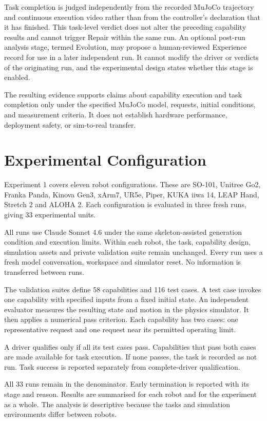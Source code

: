 Task completion is judged independently from the recorded MuJoCo trajectory
and continuous execution video rather than from the controller's declaration
that it has finished. This task-level verdict does not alter the preceding
capability results and cannot trigger Repair within the same run. An optional
post-run analysis stage, termed Evolution, may propose a human-reviewed
Experience record for use in a later independent run. It cannot modify the
driver or verdicts of the originating run, and the experimental design states
whether this stage is enabled.

The resulting evidence supports claims about capability execution and task
completion only under the specified MuJoCo model, requests, initial conditions,
and measurement criteria. It does not establish hardware performance,
deployment safety, or sim-to-real transfer.


\section{Experimental Configuration}

Experiment 1 covers eleven robot configurations. These are SO-101, Unitree
Go2, Franka Panda, Kinova Gen3, xArm7, UR5e, Piper, KUKA iiwa 14, LEAP Hand,
Stretch 2 and ALOHA 2. Each configuration is evaluated in three fresh runs,
giving 33 experimental units.

All runs use Claude Sonnet 4.6 under the same skeleton-assisted generation
condition and execution limits. Within each robot, the task, capability design,
simulation assets and private validation suite remain unchanged. Every run uses
a fresh model conversation, workspace and simulator reset. No information is
transferred between runs.

The validation suites define 58 capabilities and 116 test cases. A test case
invokes one capability with specified inputs from a fixed initial state. An
independent evaluator measures the resulting state and motion in the physics
simulator. It then applies a numerical pass criterion. Each capability has two
cases: one representative request and one request near its permitted operating
limit.

A driver qualifies only if all its test cases pass. Capabilities that pass both
cases are made available for task execution. If none passes, the task is
recorded as not run. Task success is reported separately from complete-driver
qualification.

All 33 runs remain in the denominator. Early termination is reported with its
stage and reason. Results are summarised for each robot and for the experiment
as a whole. The analysis is descriptive because the tasks and simulation
environments differ between robots.


